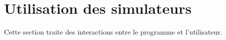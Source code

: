 \chapter{Utilisation des simulateurs}

Cette section traite des interactions entre le programme et l'utilisateur.


%
%


